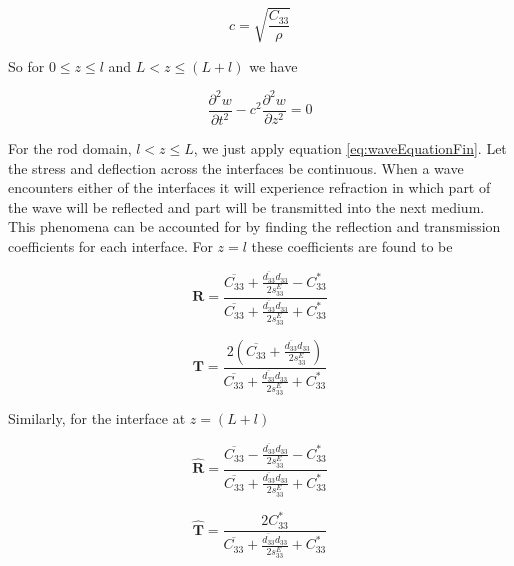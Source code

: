 \begin{equation}
c = \sqrt{\frac{C_{33}}{\rho}}
\end{equation}


So for $0 \le z \le l$ and $L < z \le (L+l)$ we have

\begin{equation}
\frac{\partial ^2w}{\partial t^2} - c^2 \frac{\partial ^2w}{\partial z^2} = 0
\label{eq:transWaveEquationFin}
\end{equation}

For the rod domain, $l < z \le L$, we just apply equation \ref{eq:waveEquationFin}. Let the stress and deflection across the interfaces be continuous. When a wave encounters either of the interfaces it will experience refraction in which part of the wave will be reflected and part will be transmitted into the next medium. This phenomena can be accounted for by finding the reflection and transmission coefficients for each interface. For $z = l$ these coefficients are found to be

\begin{equation}
\boldsymbol{R} = \frac{\overline{C_{33}} + \frac{\overline{d_{33}}d_{33}}{2s^E_{33}} - C^*_{33}}{\overline{C_{33}} + \frac{\overline{d_{33}}d_{33}}{2s^E_{33}} + C^*_{33}}
\end{equation}

\begin{equation}
\boldsymbol{T} = \frac{2\left(\overline{C_{33}} + \frac{\overline{d_{33}}d_{33}}{2s^E_{33}}\right)}{\overline{C_{33}} + \frac{\overline{d_{33}}d_{33}}{2s^E_{33}} + C^*_{33}}
\end{equation}


Similarly, for the interface at $z = (L + l)$

\begin{equation}
\boldsymbol{\hat{R}} = \frac{\overline{C_{33}} - \frac{\overline{d_{33}}d_{33}}{2s^E_{33}} - C^*_{33}}{\overline{C_{33}} + \frac{\overline{d_{33}}d_{33}}{2s^E_{33}} + C^*_{33}}
\end{equation}

\begin{equation}
\boldsymbol{\hat{T}} = \frac{2C^*_{33}}{\overline{C_{33}} + \frac{\overline{d_{33}}d_{33}}{2s^E_{33}} + C^*_{33}}
\end{equation}

